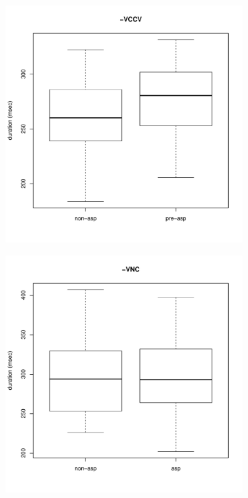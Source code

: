 \documentclass[11pt,a4paper,openany]{memoir}\usepackage[]{graphicx}\usepackage[]{color}
\newenvironment{knitrout}{}{} %
\begin{document}
\begin{figure}
\begin{subfigure}{.5\textwidth}
\begin{knitrout}
\end{knitrout}
\end{subfigure}
\begin{subfigure}{.5\textwidth}
\centering
\begin{knitrout}
\color{fgcolor}
\includegraphics[width=\textwidth]{img/di-stop-vor-1} 

\end{knitrout}
\end{subfigure}
\begin{subfigure}{.5\textwidth}
\centering
\begin{knitrout}
\color{fgcolor}
\includegraphics[width=\textwidth]{img/mono-nas-vor-1} 


\end{knitrout}
\end{subfigure}
\end{figure}
\end{document}
